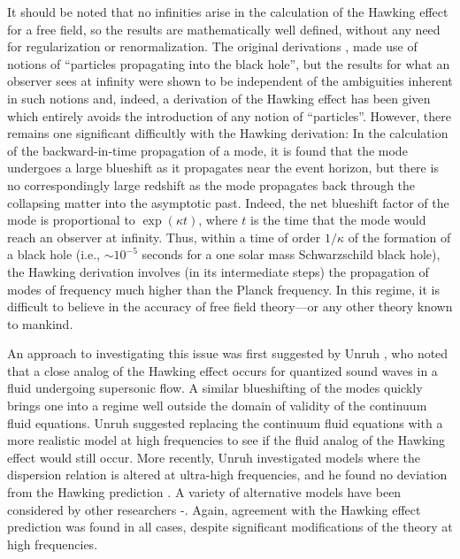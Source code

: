 It should be noted that no infinities arise in the calculation of the
Hawking effect for a free field, so the results are mathematically
well defined, without any need for regularization or
renormalization. The original derivations \cite{h2}, \cite{w7} made
use of notions of ``particles propagating into the black hole'', but
the results for what an observer sees at infinity were shown to be
independent of the ambiguities inherent in such notions and, indeed, a
derivation of the Hawking effect has been given \cite{fh} which
entirely avoids the introduction of any notion of ``particles''.
However, there remains one significant difficultly with the Hawking
derivation: In the calculation of the backward-in-time propagation of
a mode, it is found that the mode undergoes a large blueshift as it
propagates near the event horizon, but there is no correspondingly
large redshift as the mode propagates back through the collapsing
matter into the asymptotic past. Indeed, the net blueshift factor of
the mode is proportional to $\exp(\kappa t)$, where $t$ is the time
that the mode would reach an observer at infinity. Thus, within a time
of order $1/\kappa$ of the formation of a black hole (i.e., $\sim
10^{-5}$ seconds for a one solar mass Schwarzschild black hole), the
Hawking derivation involves (in its intermediate steps) the
propagation of modes of frequency much higher than the Planck
frequency. In this regime, it is difficult to believe in the accuracy
of free field theory---or any other theory known to mankind.

An approach to investigating this issue was first suggested by Unruh
\cite{u2}, who noted that a close analog of the Hawking effect occurs
for quantized sound waves in a fluid undergoing supersonic flow. A
similar blueshifting of the modes quickly brings one into a regime
well outside the domain of validity of the continuum fluid
equations. Unruh suggested replacing the continuum fluid equations
with a more realistic model at high frequencies to see if the fluid
analog of the Hawking effect would still occur. More recently, Unruh
investigated models where the dispersion relation is altered at
ultra-high frequencies, and he found no deviation from the Hawking
prediction \cite{u3}. A variety of alternative models have been
considered by other researchers \cite{bmps}-\cite{jm}. Again,
agreement with the Hawking effect prediction was found in all cases,
despite significant modifications of the theory at high frequencies.

